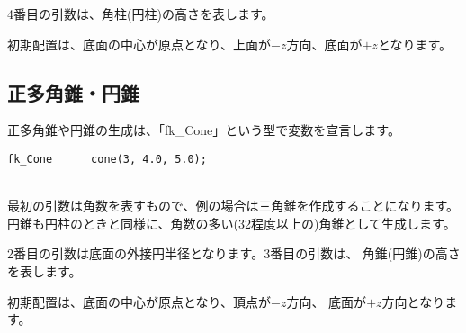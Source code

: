 4番目の引数は、角柱(円柱)の高さを表します。

初期配置は、底面の中心が原点となり、上面が\(-z\)方向、底面が\(+z\)となります。
\subsection{正多角錐・円錐}
正多角錐や円錐の生成は、「fk\_Cone」という型で変数を宣言します。\\
\begin{screen}
\begin{verbatim}
fk_Cone      cone(3, 4.0, 5.0);
\end{verbatim}
\end{screen}
~ \\
最初の引数は角数を表すもので、例の場合は三角錐を作成することになります。
円錐も円柱のときと同様に、角数の多い(32程度以上の)角錐として生成します。

2番目の引数は底面の外接円半径となります。3番目の引数は、
角錐(円錐)の高さを表します。

初期配置は、底面の中心が原点となり、頂点が\(-z\)方向、
底面が\(+z\)方向となります。
